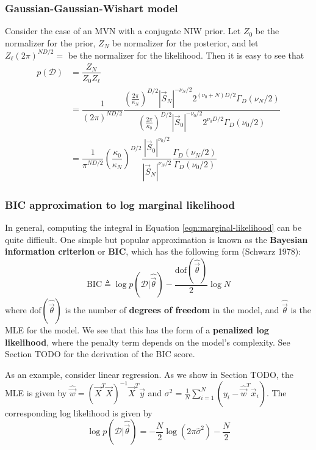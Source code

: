 \subsubsection{Gaussian-Gaussian-Wishart model}
Consider the case of an MVN with a conjugate NIW prior. Let $Z_0$ be the normalizer for the prior, $Z_N$ be normalizer for the posterior, and let $Z_{\ell}(2\pi)^{ND/2}=$ be the normalizer for the likelihood. Then it is easy to see that
\begin{align}
p(\mathcal{D})& =\dfrac{Z_N}{Z_0Z_{\ell}} \\
   & = \dfrac{1}{(2\pi)^{ND/2}}\dfrac{\left(\frac{2\pi}{\kappa_N}\right)^{D/2}|\vec{S}_N|^{-\nu_N/2}2^{(\nu_0+N)D/2}\Gamma_D(\nu_N/2)}{\left(\frac{2\pi}{\kappa_0}\right)^{D/2}|\vec{S}_0|^{-\nu_0/2}2^{\nu_0D/2}\Gamma_D(\nu_0/2)} \\
   & = \dfrac{1}{\pi^{ND/2}}\left(\dfrac{\kappa_0}{\kappa_N}\right)^{D/2}\dfrac{|\vec{S}_0|^{\nu_0/2}}{|\vec{S}_N|^{\nu_N/2}}\dfrac{\Gamma_D(\nu_N/2)}{\Gamma_D(\nu_0/2)}
\end{align}

\subsubsection{BIC approximation to log marginal likelihood}
In general, computing the integral in Equation \ref{eqn:marginal-likelihood} can be quite difficult. One simple but popular approximation is known as the \textbf{Bayesian information criterion} or \textbf{BIC}, which has the following form (Schwarz 1978):
\begin{equation}
\mathrm{BIC} \triangleq \log p(\mathcal{D}|\hat{\vec{\theta}})-\dfrac{\mathrm{dof}(\hat{\vec{\theta}})}{2}\log{N}
\end{equation}
where $\mathrm{dof}(\hat{\vec{\theta}})$ is the number of \textbf{degrees of freedom} in the model, and $\hat{\vec{\theta}}$ is the MLE for the model. We see that this has the form of a \textbf{penalized log likelihood}, where the penalty term depends on the model’s complexity. See Section TODO for the derivation of the BIC score.

As an example, consider linear regression. As we show in Section TODO, the MLE is given by $\hat{\vec{w}}=(\vec{X}^T\vec{X})^{-1}\vec{X}^T\vec{y}$ and $\sigma^2=\frac{1}{N}\sum_{i=1}^N (y_i-\hat{\vec{w}}^T\vec{x}_i)$. The corresponding log likelihood is given by
\begin{equation}
\log p(\mathcal{D}|\hat{\vec{\theta}}) = -\dfrac{N}{2}\log(2\pi\hat{\sigma}^2)-\dfrac{N}{2}
\end{equation}

